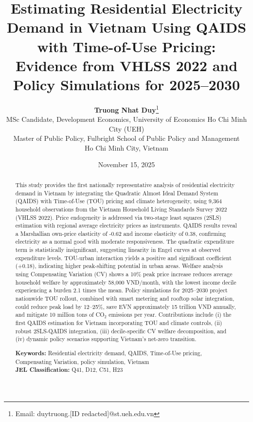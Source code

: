 \documentclass[12pt,a4paper]{article}
\title{\textbf{Estimating Residential Electricity Demand in Vietnam Using QAIDS with Time-of-Use Pricing: Evidence from VHLSS 2022 and Policy Simulations for 2025--2030}}
\author{
	\textbf{Truong Nhat Duy}\thanks{Email: duytruong.[ID redacted]@st.ueh.edu.vn} \\[0.3em]
	\small MSc Candidate, Development Economics, University of Economics Ho Chi Minh City (UEH) \\[-0.2em]
	\small Master of Public Policy, Fulbright School of Public Policy and Management \\[-0.2em]
	\small Ho Chi Minh City, Vietnam
\underline{}
\date{November 15, 2025}}
\begin{document}
	
	\maketitle
	
	\tableofcontents
	\clearpage
	
	\begin{abstract}
		\noindent This study provides the first nationally representative analysis of residential electricity demand in Vietnam by integrating the Quadratic Almost Ideal Demand System (QAIDS) with Time-of-Use (TOU) pricing and climate heterogeneity, using 9,364 household observations from the Vietnam Household Living Standards Survey 2022 (VHLSS 2022). Price endogeneity is addressed via two-stage least squares (2SLS) estimation with regional average electricity prices as instruments. QAIDS results reveal a Marshallian own-price elasticity of -0.62 and income elasticity of 0.38, confirming electricity as a normal good with moderate responsiveness. The quadratic expenditure term is statistically insignificant, suggesting linearity in Engel curves at observed expenditure levels. TOU-urban interaction yields a positive and significant coefficient (+0.18), indicating higher peak-shifting potential in urban areas. Welfare analysis using Compensating Variation (CV) shows a 10\% peak price increase reduces average household welfare by approximately 58,000 VND/month, with the lowest income decile experiencing a burden 2.1 times the mean. Policy simulations for 2025--2030 project nationwide TOU rollout, combined with smart metering and rooftop solar integration, could reduce peak load by 12--25\%, save EVN approximately 15 trillion VND annually, and mitigate 10 million tons of CO$_2$ emissions per year. Contributions include (i) the first QAIDS estimation for Vietnam incorporating TOU and climate controls, (ii) robust 2SLS-QAIDS integration, (iii) decile-specific CV welfare decomposition, and (iv) dynamic policy scenarios supporting Vietnam's net-zero transition.
		
		\vspace{1em}
		\noindent \textbf{Keywords:} Residential electricity demand, QAIDS, Time-of-Use pricing, Compensating Variation, policy simulation, Vietnam \\
		\noindent \textbf{JEL Classification:} Q41, D12, C51, H23
	\end{abstract}
	
\end{document}
